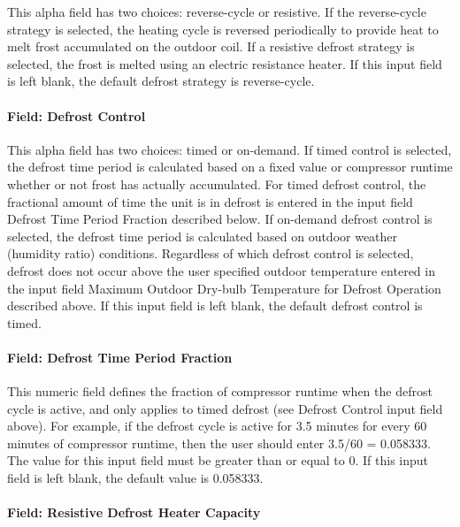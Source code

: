This alpha field has two choices: reverse-cycle or resistive. If the reverse-cycle strategy is selected, the heating cycle is reversed periodically to provide heat to melt frost accumulated on the outdoor coil. If a resistive defrost strategy is selected, the frost is melted using an electric resistance heater. If this input field is left blank, the default defrost strategy is reverse-cycle.

\paragraph{Field: Defrost Control}\label{field-defrost-control}

This alpha field has two choices: timed or on-demand. If timed control is selected, the defrost time period is calculated based on a fixed value or compressor runtime whether or not frost has actually accumulated. For timed defrost control, the fractional amount of time the unit is in defrost is entered in the input field Defrost Time Period Fraction described below. If on-demand defrost control is selected, the defrost time period is calculated based on outdoor weather (humidity ratio) conditions. Regardless of which defrost control is selected, defrost does not occur above the user specified outdoor temperature entered in the input field Maximum Outdoor Dry-bulb Temperature for Defrost Operation described above. If this input field is left blank, the default defrost control is timed.

\paragraph{Field: Defrost Time Period Fraction}\label{field-defrost-time-period-fraction}

This numeric field defines the fraction of compressor runtime when the defrost cycle is active, and only applies to timed defrost (see Defrost Control input field above). For example, if the defrost cycle is active for 3.5 minutes for every 60 minutes of compressor runtime, then the user should enter 3.5/60 = 0.058333. The value for this input field must be greater than or equal to 0. If this input field is left blank, the default value is 0.058333.

\paragraph{Field: Resistive Defrost Heater Capacity}\label{field-resistive-defrost-heater-capacity}

